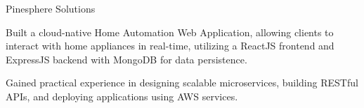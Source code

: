    {Pinesphere Solutions} {}
    \resumeItemListStart                
          {
    \item Built a cloud-native Home Automation Web Application, allowing clients to interact with home appliances in real-time, utilizing a ReactJS frontend and ExpressJS backend with MongoDB for data persistence.
  \item Gained practical experience in designing scalable microservices, building RESTful APIs, and deploying applications using AWS services.
  }
\resumeItemListEnd

\resumeSubHeadingListEnd
\vspace{5pt}

